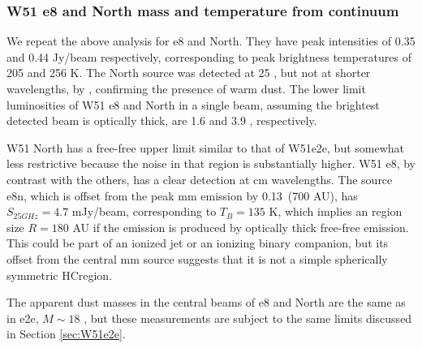\documentclass[twocolumn]{aastex61}
\begin{document}
\subsubsection{W51 e8 and North mass and temperature from continuum}
\label{sec:w51e8andnorth}
We repeat the above analysis for e8 and North.  They have peak intensities
of 0.35 and 0.44 Jy/beam respectively, corresponding to peak brightness
temperatures of 205 and 256 K.  The North source was detected at 25 \um, but
not at shorter wavelengths, by \citet{Barbosa2016a}, confirming the presence
of warm dust.
The lower limit luminosities of W51 e8 and North in a single beam, assuming the
brightest detected beam is optically thick, are 1.6 and 3.9 \lsun,
respectively.


W51 North has a free-free upper limit similar to that of W51e2e, but somewhat less
restrictive because the noise in that region is substantially higher.  W51 e8,
by contrast with the others, has a clear detection at cm wavelengths.  The
source e8n, which is offset from the peak mm emission by 0.13\arcsec\ (700 AU),
has $S_{25 GHz}=4.7$ mJy/beam, corresponding to $T_B=135$ K, which implies an
\hii region size $R=180$ AU if the emission is produced by  optically thick
free-free emission.  This could be part of an ionized jet or an ionizing binary
companion, but its offset from the central mm source
suggests that it is not a simple spherically symmetric HC\hii region.

The apparent dust masses in the central beams of e8 and North are the same
as in e2e, $M\sim18$ \msun, but these measurements are subject to the same
limits discussed in Section \ref{sec:W51e2e}.
\end{document}
